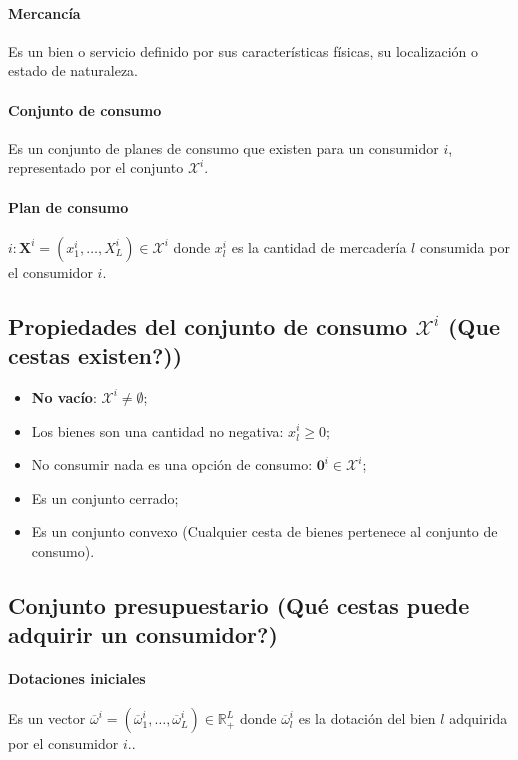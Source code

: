 \paragraph{Mercancía} Es un bien o servicio definido por sus características físicas, su localización o estado de naturaleza.\\
\paragraph{Conjunto de consumo} Es un conjunto de planes de consumo que existen para un consumidor $i$, representado por el conjunto $\mathcal{X}^i$.
\paragraph{Plan de consumo} $i:\textbf{X}^i=\left(x_1^i,\ldots,X_L^i\right)\in \mathcal{X}^i$ donde $x_l^i$ es la cantidad de mercadería $l$ consumida por el consumidor $i$.

\subsection{Propiedades del conjunto de consumo \boldmath$\mathcal{X}^i$ (Que cestas existen?))}

\begin{itemize}
    \item \textbf{No vacío}: $\mathcal{X}^i\neq \emptyset$;
    \item Los bienes son una cantidad no negativa: $x_l^i\geq 0$;
    \item No consumir nada es una opción de consumo: $\textbf{0}^i\in \mathcal{X}^i$;
    \item Es un conjunto cerrado;
    \item Es un conjunto convexo (Cualquier cesta de bienes pertenece al conjunto de consumo).
\end{itemize}

\subsection{Conjunto presupuestario (Qué cestas puede adquirir un consumidor?)}
\paragraph{Dotaciones iniciales} Es un vector $\overline{\omega}^i = \left(\overline{\omega}_1^i,\ldots,\overline{\omega}_L^i\right)\in \mathbb{R}^L_+$ donde $\overline{\omega}^i_l$ es la dotación del bien $l$ adquirida por el consumidor $i$..
